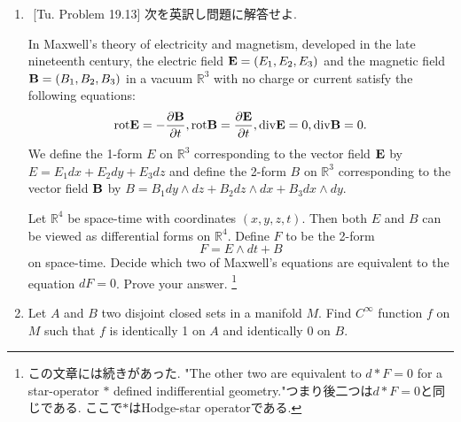 \documentclass[dvipdfmx,a4paper,11pt]{article}
\newcommand{\R}{\mathbb{R}}
\newcommand{\Supp}{{\rm Supp}}
\theoremstyle{definition}
\newcommand{\pdrv}[2]{\frac{\partial #1}{\partial #2}}
\begin{document}
\begin{enumerate}[label=\textbf{問}3.\arabic*]
\newpage 
\item $^{}$ [Tu. Problem 19.13] 次を英訳し問題に解答せよ.

In Maxwell's theory of electricity and magnetism, developed in the late nineteenth century,
the electric field ${\bf E} = (E_1, E_2, E_3)$ and the magnetic field ${\bf B} = (B_1, B_2, B_3)$ in a vacuum
$\R^3$
with no charge or current satisfy the following equations:
$$
{\rm rot}{\bf E} = - \pdrv{{\bf B}}{t} ,  
{\rm rot} {\bf B} = \pdrv{{\bf E}}{t}, 
{\rm div} {\bf E} = 0,
{\rm div} {\bf B} = 0. 
$$
We define the 1-form $E$ on $\R^3$ corresponding to the vector field $ { \bf E}$ by $E = E_1 dx + E_2 dy + E_3 dz$ and define the 2-form $B$ on $\R^3$ corresponding to the vector field ${ \bf B}$ by $B = B_1 dy \wedge dz + B_2 dz \wedge dx + B_3 dx \wedge dy$. 

Let $\R^4$ be space-time with coordinates $(x, y, z, t)$. 
Then both $E$ and $B$ can be viewed as
differential forms on $\R^4$. Define $F$ to be the 2-form
$$
F = E \wedge dt + B
$$
on space-time. Decide which two of Maxwell's equations are equivalent to the equation $dF =0$.
Prove your answer. \footnote{この文章には続きがあった. "The other two are equivalent to $d * F = 0$ for a star-operator $*$ defined indifferential geometry."つまり後二つは$d * F =0$と同じである. ここで$*$はHodge-star operatorである. }


\vspace{11pt}
\hspace{-33pt}{\large $\bullet$1の分割・多様体上の積分・ストークスの定理}

\item %
Let $A$ and $B$ two disjoint closed sets in a manifold $M$. Find $C^{\infty}$ function $f$ on $M$ such that $f$ is identically 1 on $A$ and identically 0 on $B$.


\end{enumerate}
\end{document}
